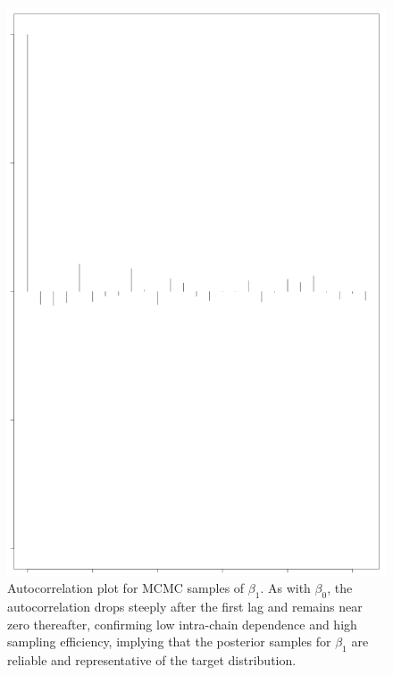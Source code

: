 \documentclass[]{article}
\begin{document}
\begin{figure}
	\centering
	\includegraphics[width=0.7\linewidth]{img/img-autocorr-beta1}
	\caption{Autocorrelation plot for MCMC samples of $\beta_1$. As with $\beta_0$, the autocorrelation drops steeply after the first lag and remains near zero thereafter, confirming low intra-chain dependence and high sampling efficiency, implying that the posterior samples for $\beta_1$ are reliable and representative of the target distribution.}
	\label{fig:img-autocorr-beta1}
\end{figure}
\end{document}
